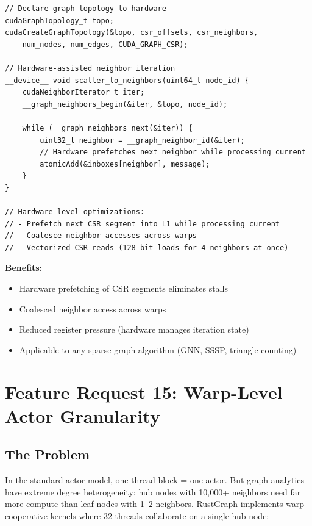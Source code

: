 \documentclass[11pt,a4paper]{article}
\newenvironment{benefitsbox}{%
    \vspace{6pt}%
    \noindent\textbf{Benefits:}%
    \begin{itemize}[leftmargin=1.5em,topsep=2pt,itemsep=1pt]%
}{%
    \end{itemize}%
    \vspace{6pt}%
}
\begin{document}
\begin{lstlisting}[style=cstyle,title={Hardware-accelerated neighbor iteration}]
// Declare graph topology to hardware
cudaGraphTopology_t topo;
cudaCreateGraphTopology(&topo, csr_offsets, csr_neighbors,
    num_nodes, num_edges, CUDA_GRAPH_CSR);

// Hardware-assisted neighbor iteration
__device__ void scatter_to_neighbors(uint64_t node_id) {
    cudaNeighborIterator_t iter;
    __graph_neighbors_begin(&iter, &topo, node_id);

    while (__graph_neighbors_next(&iter)) {
        uint32_t neighbor = __graph_neighbor_id(&iter);
        // Hardware prefetches next neighbor while processing current
        atomicAdd(&inboxes[neighbor], message);
    }
}

// Hardware-level optimizations:
// - Prefetch next CSR segment into L1 while processing current
// - Coalesce neighbor accesses across warps
// - Vectorized CSR reads (128-bit loads for 4 neighbors at once)
\end{lstlisting}

\begin{benefitsbox}
    \item Hardware prefetching of CSR segments eliminates stalls
    \item Coalesced neighbor access across warps
    \item Reduced register pressure (hardware manages iteration state)
    \item Applicable to any sparse graph algorithm (GNN, SSSP, triangle counting)
\end{benefitsbox}

\newpage

\section{Feature Request 15: Warp-Level Actor Granularity}

\subsection{The Problem}

In the standard actor model, one thread block = one actor. But graph analytics have extreme degree heterogeneity: hub nodes with 10,000+ neighbors need far more compute than leaf nodes with 1--2 neighbors. RustGraph implements warp-cooperative kernels where 32 threads collaborate on a single hub node:
\end{document}
